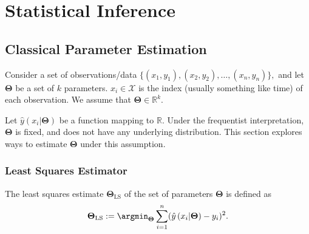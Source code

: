 \chapter{Statistical Inference}

\section{Classical Parameter Estimation}

Consider a set of observations/data $\{(x_1, y_1), (x_2, y_2), \dots, (x_n, y_n)\},$ and let $\mathbf{\Theta}$ be a set of $k$ parameters. $x_i\in\mathcal{X}$ is the index (usually something like time) of each observation. We assume that $\mathbf\Theta\in\mathbb{R}^k.$

Let $\hat{y}\left(x_i | \mathbf{\Theta}\right)$ be a function mapping to $\mathbb{R}.$ Under the frequentist interpretation, $\mathbf\Theta$ is fixed, and does not have any underlying distribution. This section explores ways to estimate $\mathbf\Theta$ under this assumption.

\subsection*{Least Squares Estimator}

The least squares estimate $\mathbf{\Theta}_{\mathrm{LS}}$ of the set of parameters $\mathbf{\Theta}$ is defined as $$\mathbf{\Theta}_{\mathrm{LS}} := \argmin_{\mathbf{\Theta}} \sum_{i = 1}^n (\hat{y}\left(x_i | \mathbf{\Theta}\right)- y_i)^2.$$

